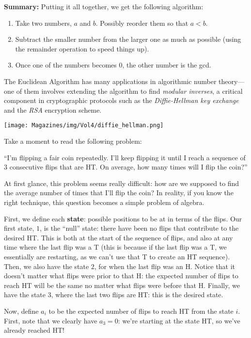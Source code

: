 \documentclass{article}
\begin{document}
\begin{multicols}{3}
\textbf{Summary:} Putting it all together, we get the following algorithm:
\begin{enumerate}
\item Take two numbers, $a$ and $b$. Possibly reorder them so that $a < b$.
\item Subtract the smaller number from the larger one as much as possible (using the remainder operation to speed things up).
\item Once one of the numbers becomes 0, the other number is the gcd.
\end{enumerate}
The Euclidean Algorithm has many applications in algorithmic number theory—one of them involves extending the algorithm to find \textit{modular inverses}, a critical component in cryptographic protocols such as the \textit{Diffie-Hellman key exchange} and the \textit{RSA} encryption scheme.
\begin{center}
\texttt{[image: Magazines/img/Vol4/diffie\_hellman.png]}
\end{center}
\closearticle


Take a moment to read the following problem:

``I'm flipping a fair coin repeatedly. I'll keep flipping it until I reach a sequence of 3 consecutive flips that are HT. On average, how many times will I flip the coin?''

At first glance, this problem seems really difficult: how are we supposed to find the average number of times that I'll flip the coin? In reality, if you know the right technique, this question becomes a simple problem of algebra.


First, we define each \textbf{state}: possible positions to be at in terms of the flips. Our first state, $1$, is the ``null'' state: there have been no flips that contribute to the desired HT. This is both at the start of the sequence of flips, and also at any time where the last flip was a T (this is because if the last flip was a T, we essentially are restarting, as we can't use that T to create an HT sequence). Then, we also have the state $2$, for when the last flip was an H. Notice that it doesn't matter what flips were prior to that H: the expected number of flips to reach HT will be the same no matter what flips were before that H. Finally, we have the state $3$, where the last two flips are HT: this is the desired state.

Now, define $a_i$ to be the expected number of flips to reach HT from the state $i$. First, note that we clearly have $a_3=0$: we're starting at the state HT, so we've already reached HT!


\end{multicols}
\end{document}
